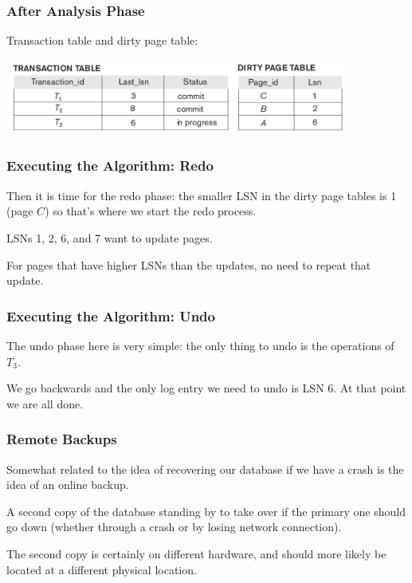 \begin{frame}
\frametitle{After Analysis Phase}

Transaction table and dirty page table:

\begin{center}
\includegraphics[width=0.85\textwidth]{images/aries-3}
\end{center}


\end{frame}


\begin{frame}
\frametitle{Executing the Algorithm: Redo}

Then it is time for the redo phase: the smaller LSN in the dirty page tables is 1 (page $C$) so that's where we start the redo process. 

LSNs 1, 2, 6, and 7 want to update pages. 

For pages that have higher LSNs than the updates, no need to repeat that update.


\end{frame}


\begin{frame}
\frametitle{Executing the Algorithm: Undo}

The undo phase here is very simple: the only thing to undo is the operations of $T_{3}$. 

We go backwards and the only log entry we need to undo is LSN 6. At that point we are all done.


\end{frame}


\begin{frame}
\frametitle{Remote Backups}

Somewhat related to the idea of recovering our database if we have a crash is the idea of an online backup. 

A second copy of the database standing by to take over if the primary one should go down (whether through a crash or by losing network connection). 

The second copy is certainly on different hardware, and should more likely be located at a different physical location. 

\end{frame}


